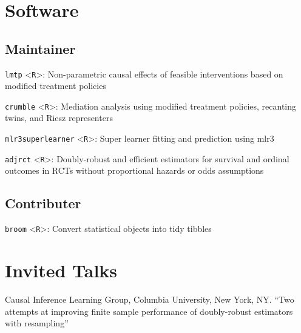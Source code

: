\documentclass[12pt,letterpaper]{report}
\newcommand{\listitemspace}{0.15em}
\renewenvironment{itemize}
{\begin{list}{}{\setlength{\leftmargin}{0em}
            \setlength{\parskip}{0em}
            \setlength{\itemsep}{\listitemspace}
            \setlength{\parsep}{\listitemspace}}}
    {\end{list}}
\begin{document}
    \section*{Software}
    
    \subsection*{Maintainer}
    
        \begin{itemize}
        
        \item \texttt{lmtp} <\texttt{R}>: Non-parametric causal effects of feasible interventions based on modified treatment policies
        
        \item \texttt{crumble} <\texttt{R}>: Mediation analysis using modified treatment policies, recanting twins, and Riesz representers
        
        \item \texttt{mlr3superlearner} <\texttt{R}>: Super learner fitting and prediction using mlr3
        
        \item \texttt{adjrct} <\texttt{R}>: Doubly-robust and efficient estimators for survival and ordinal outcomes in RCTs without proportional hazards or odds assumptions
    
   	\end{itemize}
    
    \subsection*{Contributer}
    
    \begin{itemize}
    
    	\item \texttt{broom} <\texttt{R}>: Convert statistical objects into tidy tibbles
    
    \end{itemize}
    
    \section*{Invited Talks}
    
    \begin{tablist}
    
    	\item[2026]\tab Causal Inference Learning Group, Columbia University, New York, NY. \enquote{Two attempts at improving finite sample performance of doubly-robust estimators with resampling}
    
    \end{tablist}
\end{document}
